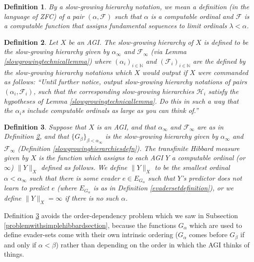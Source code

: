 \documentclass{article}
\newtheorem{definition}{Definition}
\begin{document}
\begin{definition}
    By a \emph{slow-growing hierarchy notation}, we mean a
    definition (in the language of ZFC) of a pair $(\alpha,\mathcal F)$
    such that $\alpha$ is a computable ordinal and $\mathcal F$ is a computable
    function that assigns fundamental sequences to limit ordinals $\lambda<\alpha$.
\end{definition}

\begin{definition}
\label{slowgrowinghierarchyofanagidefn}
    Let $X$ be an AGI. The \emph{slow-growing hierarchy of $X$} is defined to be
    the slow-growing hierarchy given by $\alpha_\infty$ and $\mathcal F_\infty$
    (via Lemma \ref{slowgrowingtechnicallemma}) where $(\alpha_i)_{i\in\mathbb N}$
    and $(\mathcal F_i)_{i\in\mathbb N}$ are the defined by the
    slow-growing hierarchy notations which
    $X$ would output if $X$ were commanded as follows:
    ``Until further notice, output slow-growing hierarchy
    notations of pairs $(\alpha_i,\mathcal F_i)$, such that
    the corresponding slow-growing hierarchies $\mathcal H_i$ satisfy
    the hypotheses of Lemma \ref{slowgrowingtechnicallemma}. Do this in such a way
    that the $\alpha_i$s include computable ordinals as large as you can think of.''
\end{definition}

\begin{definition}
\label{transfinitehibbardmeasuredefn}
    Suppose that $X$ is an AGI, and that
    $\alpha_\infty$ and $\mathcal F_\infty$ are as in
    Definition \ref{slowgrowinghierarchyofanagidefn}, and that
    $\{G_\beta\}_{\beta<\alpha_\infty}$ is the slow-growing hierarchy
    given by $\alpha_\infty$ and $\mathcal F_\infty$
    (Definition \ref{slowgrowinghierarchiesdefn}).
    The \emph{transfinite Hibbard measure given by $X$} is
    the function which assigns to each AGI $Y$ a computable ordinal (or $\infty$)
    $\|Y\|_X$
    defined as follows.
    We define $\|Y\|_X$ to be the smallest ordinal $\alpha<\alpha_\infty$ such that
    there is some evader $e\in E_{G_\alpha}$ such that $Y$'s predictor does not
    learn to predict $e$ (where $E_{G_\alpha}$ is as in Definition \ref{evadersetdefinition}),
    or we define $\|Y\|_X=\infty$ if there is no such $\alpha$.
\end{definition}

Definition \ref{transfinitehibbardmeasuredefn} avoids the order-dependency problem which
we saw in Subsection \ref{problemwithsimplehibbardsection}, because the functions
$G_{\alpha}$ which are used to define evader-sets come with their own intrinsic ordering
($G_{\alpha}$ comes before $G_{\beta}$ if and only if $\alpha<\beta$) rather than
depending on the order in which the AGI thinks of things.
\end{document}
